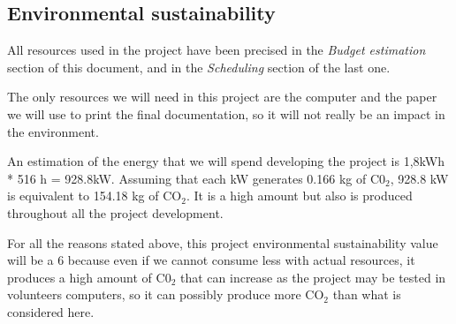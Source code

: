 \subsection{Environmental sustainability}
All resources used in the project have been precised in the \textit{Budget estimation} section of this document, and in the \textit{Scheduling} section of the last one.

The only resources we will need in this project are the computer and the paper we will use to print the final documentation, so it will not really be an impact in the environment.

An estimation of the energy that we will spend developing the project is 1,8kWh * 516 h = 928.8kW. Assuming that each kW generates 0.166 kg of C0$_2$, 928.8 kW is equivalent to 154.18 kg of CO$_2$. It is a high amount but also is produced throughout all the project development.

For all the reasons stated above, this project environmental sustainability value will be a 6 because even if we cannot consume less with actual resources, it produces a high amount of C0$_2$ that can increase as the project may be tested in volunteers computers, so it can possibly produce more CO$_2$ than what is considered here.